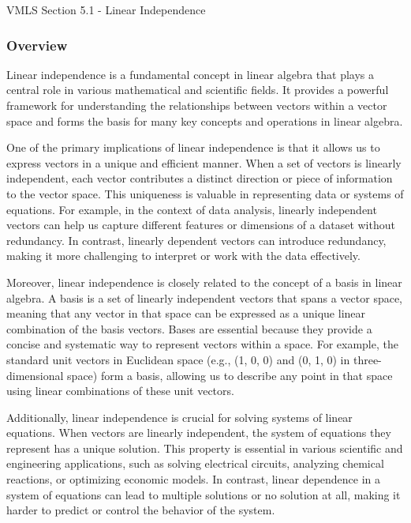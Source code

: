 \begin{notes}{VMLS Section 5.1 - Linear Independence}
    \subsubsection*{Overview}

    Linear independence is a fundamental concept in linear algebra that plays a central role in various mathematical and scientific fields. It provides a powerful framework for understanding the 
    relationships between vectors within a vector space and forms the basis for many key concepts and operations in linear algebra.

    One of the primary implications of linear independence is that it allows us to express vectors in a unique and efficient manner. When a set of vectors is linearly independent, each vector 
    contributes a distinct direction or piece of information to the vector space. This uniqueness is valuable in representing data or systems of equations. For example, in the context of data analysis, 
    linearly independent vectors can help us capture different features or dimensions of a dataset without redundancy. In contrast, linearly dependent vectors can introduce redundancy, making it more 
    challenging to interpret or work with the data effectively.
    
    Moreover, linear independence is closely related to the concept of a basis in linear algebra. A basis is a set of linearly independent vectors that spans a vector space, meaning that any vector 
    in that space can be expressed as a unique linear combination of the basis vectors. Bases are essential because they provide a concise and systematic way to represent vectors within a space. For 
    example, the standard unit vectors in Euclidean space (e.g., (1, 0, 0) and (0, 1, 0) in three-dimensional space) form a basis, allowing us to describe any point in that space using linear 
    combinations of these unit vectors.
    
    Additionally, linear independence is crucial for solving systems of linear equations. When vectors are linearly independent, the system of equations they represent has a unique solution. This 
    property is essential in various scientific and engineering applications, such as solving electrical circuits, analyzing chemical reactions, or optimizing economic models. In contrast, linear 
    dependence in a system of equations can lead to multiple solutions or no solution at all, making it harder to predict or control the behavior of the system.
    

\end{notes}
